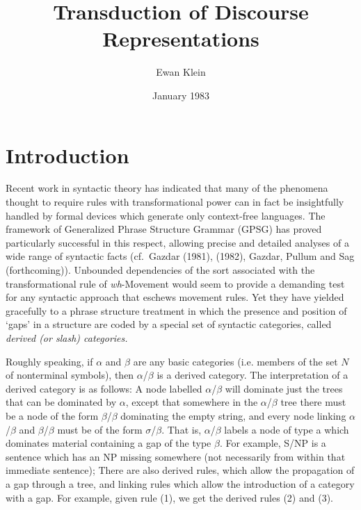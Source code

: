 \documentclass[11pt]{article}
\title{Transduction of Discourse Representations}
\date{January 1983}
\author{Ewan Klein}
\begin{document}
\maketitle

\section{Introduction}

Recent work in syntactic theory has indicated that many of the phenomena thought to require rules
with transformational power can in fact be insightfully handled by formal devices which generate
only context-free languages. The framework of Generalized Phrase Structure Grammar (GPSG) has
proved particularly successful in this respect, allowing precise and detailed analyses of a wide
range of syntactic facts (cf.\ Gazdar (1981), (1982), Gazdar, Pullum and Sag (forthcoming)).
Unbounded dependencies of the sort associated with the transformational rule of \textit{wh}-Movement would
seem to provide a demanding test for any syntactic approach that eschews movement rules. Yet they
have yielded gracefully to a phrase structure treatment in which the presence and position of `gaps'
in a structure are coded by a special set of syntactic categories, called \em{derived} (or \em{slash})
categories.

Roughly speaking, if $\alpha$ and $\beta$ are any basic categories (i.e. members of the
set $N$ of nonterminal symbols), then $\alpha$/$\beta$ is a derived category. The interpretation of a
derived category is as follows: A node labelled $\alpha$/$\beta$ will dominate just the trees that
can be dominated by $\alpha$, except that somewhere in the $\alpha$/$\beta$ tree there must be a node of
the form $\beta$/$\beta$ dominating the empty string, and every node linking $\alpha$/$\beta$ and
$\beta$/$\beta$ must be of the form $\sigma$/$\beta$. That is, $\alpha$/$\beta$ labels a node of
type a which dominates material containing a gap of the type $\beta$. For example, S/NP is a
sentence which has an NP missing somewhere (not necessarily from within that immediate sentence);
There are also derived rules, which allow the propagation of a gap through a tree, and linking rules
which allow the introduction of a category with a gap. For example, given rule (1), we get the
derived rules (2) and (3).
\end{document}
